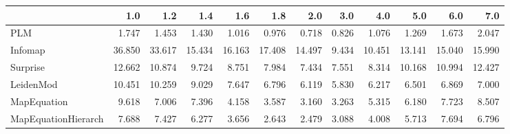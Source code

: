 \begin{tabular}{lrrrrrrrrrrr}
\toprule
{} &    1.0 &    1.2 &    1.4 &    1.6 &    1.8 &    2.0 &   3.0 &    4.0 &    5.0 &    6.0 &    7.0 \\
\midrule
PLM                 &  1.747 &  1.453 &  1.430 &  1.016 &  0.976 &  0.718 & 0.826 &  1.076 &  1.269 &  1.673 &  2.047 \\
Infomap             & 36.850 & 33.617 & 15.434 & 16.163 & 17.408 & 14.497 & 9.434 & 10.451 & 13.141 & 15.040 & 15.990 \\
Surprise            & 12.662 & 10.874 &  9.724 &  8.751 &  7.984 &  7.434 & 7.551 &  8.314 & 10.168 & 10.994 & 12.427 \\
LeidenMod           & 10.451 & 10.259 &  9.029 &  7.647 &  6.796 &  6.119 & 5.830 &  6.217 &  6.501 &  6.869 &  7.000 \\
MapEquation         &  9.618 &  7.006 &  7.396 &  4.158 &  3.587 &  3.160 & 3.263 &  5.315 &  6.180 &  7.723 &  8.507 \\
MapEquationHierarch &  7.688 &  7.427 &  6.277 &  3.656 &  2.643 &  2.479 & 3.088 &  4.008 &  5.713 &  7.694 &  6.796 \\
\bottomrule
\end{tabular}
